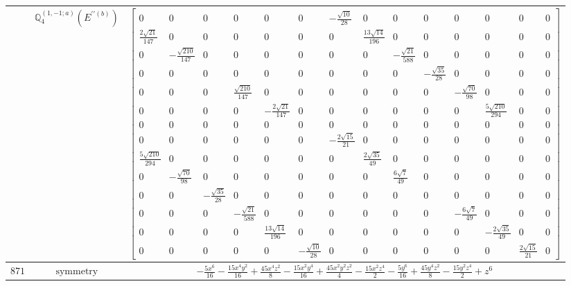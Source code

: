 \documentclass[fleqn,8pt,landscape]{jsarticle}
\begin{document}
\begin{longtable}{ccc}
$  $ & $ \mathbb{Q}_{4}^{(1,-1;a)}(E^{\prime\prime(b)}) $ & $ \begin{bmatrix} 0 & 0 & 0 & 0 & 0 & 0 & - \frac{\sqrt{10}}{28} & 0 & 0 & 0 & 0 & 0 & 0 & 0 \\ \frac{2 \sqrt{21}}{147} & 0 & 0 & 0 & 0 & 0 & 0 & \frac{13 \sqrt{14}}{196} & 0 & 0 & 0 & 0 & 0 & 0 \\ 0 & - \frac{\sqrt{210}}{147} & 0 & 0 & 0 & 0 & 0 & 0 & - \frac{\sqrt{21}}{588} & 0 & 0 & 0 & 0 & 0 \\ 0 & 0 & 0 & 0 & 0 & 0 & 0 & 0 & 0 & - \frac{\sqrt{35}}{28} & 0 & 0 & 0 & 0 \\ 0 & 0 & 0 & \frac{\sqrt{210}}{147} & 0 & 0 & 0 & 0 & 0 & 0 & - \frac{\sqrt{70}}{98} & 0 & 0 & 0 \\ 0 & 0 & 0 & 0 & - \frac{2 \sqrt{21}}{147} & 0 & 0 & 0 & 0 & 0 & 0 & \frac{5 \sqrt{210}}{294} & 0 & 0 \\ 0 & 0 & 0 & 0 & 0 & 0 & 0 & 0 & 0 & 0 & 0 & 0 & 0 & 0 \\ 0 & 0 & 0 & 0 & 0 & 0 & - \frac{2 \sqrt{15}}{21} & 0 & 0 & 0 & 0 & 0 & 0 & 0 \\ \frac{5 \sqrt{210}}{294} & 0 & 0 & 0 & 0 & 0 & 0 & \frac{2 \sqrt{35}}{49} & 0 & 0 & 0 & 0 & 0 & 0 \\ 0 & - \frac{\sqrt{70}}{98} & 0 & 0 & 0 & 0 & 0 & 0 & \frac{6 \sqrt{7}}{49} & 0 & 0 & 0 & 0 & 0 \\ 0 & 0 & - \frac{\sqrt{35}}{28} & 0 & 0 & 0 & 0 & 0 & 0 & 0 & 0 & 0 & 0 & 0 \\ 0 & 0 & 0 & - \frac{\sqrt{21}}{588} & 0 & 0 & 0 & 0 & 0 & 0 & - \frac{6 \sqrt{7}}{49} & 0 & 0 & 0 \\ 0 & 0 & 0 & 0 & \frac{13 \sqrt{14}}{196} & 0 & 0 & 0 & 0 & 0 & 0 & - \frac{2 \sqrt{35}}{49} & 0 & 0 \\ 0 & 0 & 0 & 0 & 0 & - \frac{\sqrt{10}}{28} & 0 & 0 & 0 & 0 & 0 & 0 & \frac{2 \sqrt{15}}{21} & 0 \end{bmatrix} $ \\ \hline
$ 871 $ & $ \text{symmetry} $ & $ - \frac{5 x^{6}}{16} - \frac{15 x^{4} y^{2}}{16} + \frac{45 x^{4} z^{2}}{8} - \frac{15 x^{2} y^{4}}{16} + \frac{45 x^{2} y^{2} z^{2}}{4} - \frac{15 x^{2} z^{4}}{2} - \frac{5 y^{6}}{16} + \frac{45 y^{4} z^{2}}{8} - \frac{15 y^{2} z^{4}}{2} + z^{6} $ \\

\end{longtable}
\end{document}
